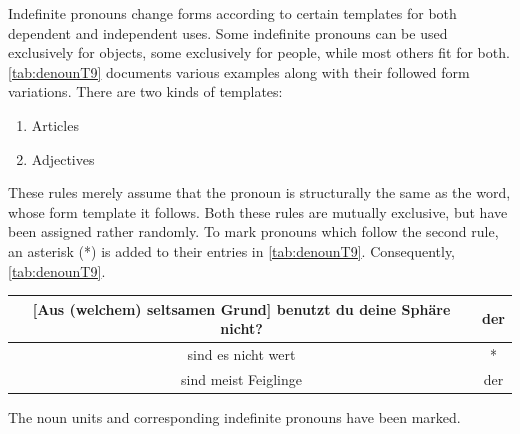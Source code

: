 Indefinite pronouns change forms according to certain templates for both dependent and independent uses. Some indefinite pronouns  can be used exclusively for objects, some exclusively for people, while most others fit for both. \autoref{tab:denounT9} documents various examples along with their followed  form variations. There are two kinds of  templates:
\begin{enumerate}
    \item Articles
    \item Adjectives
\end{enumerate}
These rules merely assume that the pronoun is structurally the same as the word, whose form template it follows.  Both these rules are mutually exclusive, but have been assigned rather randomly. To mark pronouns which follow the second rule, an asterisk (*) is added to their entries in \autoref{tab:denounT9}. Consequently,  \autoref{tab:denounT9}.
\begin{example}
    \begin{tabular}{c|c}
        [Aus (welchem) seltsamen Grund] benutzt du deine Sphäre nicht? & der\\\hline
        [(Manche) teuere Flaschen] sind es nicht wert & *\\\hline
        [(Solche) einzelnen Menschen] sind meist Feiglinge & der
    \end{tabular}
\end{example}
The noun units and corresponding indefinite pronouns have been marked. 
